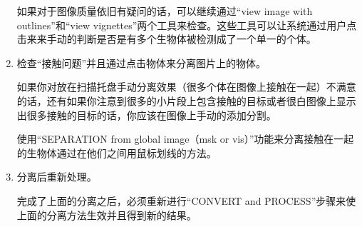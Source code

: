 \begin{enumerate}
				如果对于图像质量依旧有疑问的话，可以继续通过“view image with outlines”和“view vignettes”两个工具来检查。这些工具可以让系统通过用户点击来来手动的判断是否是有多个生物体被检测成了一个单一的个体。
			\item 检查“接触问题”并且通过点击物体来分离图片上的物体。
				
				如果你对放在扫描托盘手动分离效果（很多个体在图像上接触在一起）不满意的话，还有如果你注意到很多的小片段上包含接触的目标或者很白图像上显示出很多接触的目标的话，你应该在图像上手动的添加分割。

	使用“SEPARATION from global image（msk or vis）”功能来分离接触在一起的生物体通过在他们之间用鼠标划线的方法。
			\item 分离后重新处理。
				
				完成了上面的分离之后，必须重新进行“CONVERT and PROCESS”步骤来使上面的分离方法生效并且得到新的结果。
		\end{enumerate}

